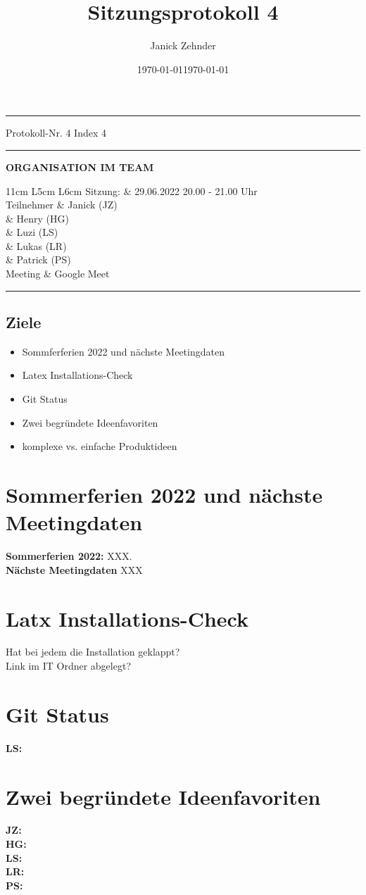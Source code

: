 \documentclass[10pt]{extarticle}
\date{}
\date{\today}
\makeatletter
\renewenvironment{abstract}
 {\par\noindent\ignorespaces}
 {\par\medskip}
\renewcommand{\maketitle}{\setlength{\parindent}{0pt}
\begin{flushleft}
  \huge\@title
  \par\vspace{1cm}
  \normalsize\@author
  \vspace{1cm}  
  
  \hrule
  \begin{minipage}[t]{\textwidth}
    \begin{minipage}[t]{0.25\textwidth}
    \vspace{0.3cm}
	Protokoll-Nr. 4 
	Index 4
    \vspace{0.3cm}
	\hrule
	\vspace{0.3cm}
	\date{\today}
	\vspace{0.3cm}
	\end{minipage}
	\begin{minipage}[t]{0.05\textwidth}
	 \hfill
	\end{minipage}
	\begin{minipage}[t]{0.70\textwidth}
	\begin{flushleft}    
	\vspace{0.3cm}
	\textbf{ORGANISATION IM TEAM}
	\vspace{0.3cm}
	
\begin{tabularx}{11cm} { 
   L{5cm}
   L{6cm}
  }
 \toprule
 Sitzung: & 29.06.2022 20.00 - 21.00 Uhr\\
 Teilnehmer & Janick (JZ) \\
 			& Henry (HG) \\
 			& Luzi (LS) \\
 			& Lukas (LR) \\
            & Patrick (PS)\\
 Meeting & Google Meet \\
 \end{tabularx}	
\begin{abstract}
\end{abstract}
\end{flushleft}
    \vspace{0.3cm}
	\end{minipage}
  \end{minipage}
  
  \hrule
\end{flushleft}
\vspace{1cm}

}
\makeatother
\begin{document}
\title{Sitzungsprotokoll 4}
\author{Janick Zehnder}
\maketitle


\colorbox{light-gray}{\begin{minipage}{17cm}
\vspace{0.25cm}
\section*{Ziele}
\begin{itemize}
\item Sommferferien 2022 und nächste Meetingdaten
\item Latex Installations-Check
\item Git Status
\item Zwei begründete Ideenfavoriten
\item komplexe vs. einfache Produktideen
\end{itemize}
\vspace{0.25cm}
\end{minipage}}



\section{Sommerferien 2022 und nächste Meetingdaten}
\textbf{Sommerferien 2022:} XXX.\\
\textbf{Nächste Meetingdaten} XXX\\

\section{Latx Installations-Check}
Hat bei jedem die Installation geklappt?\\
Link im IT Ordner abgelegt?\\

\section{Git Status}
\textbf{LS:}\\

\section{Zwei begründete Ideenfavoriten}
\textbf{JZ:}\\
\textbf{HG:}\\
\textbf{LS:}\\
\textbf{LR:}\\
\textbf{PS:}\\
\end{document}
